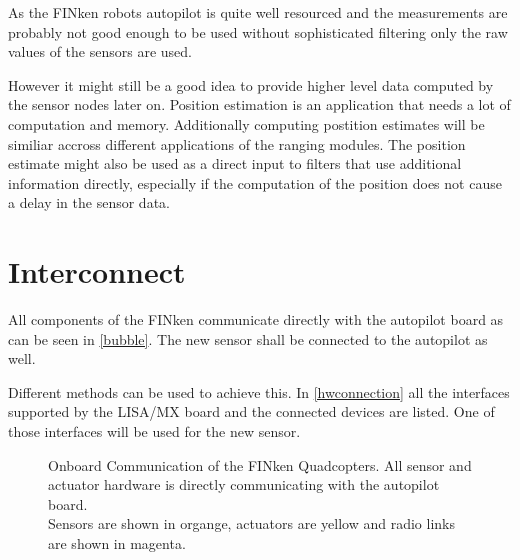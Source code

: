 As the FINken robots autopilot is quite well resourced and the measurements are probably not good enough to be used without sophisticated filtering only the raw values of the sensors are used.

However it might still be a good idea to provide higher level data computed by the sensor nodes later on.
Position estimation is an application that needs a lot of computation and memory.
Additionally computing postition estimates will be similiar accross different applications of the ranging modules.
The position estimate might also be used as a direct input to filters that use additional information directly, especially if the computation of the position does not cause a delay in the sensor data.


\section{Interconnect}
All components of the FINken communicate directly with the autopilot board as can be seen in \autoref{bubble}.
The new sensor shall be connected to the autopilot as well.

Different methods can be used to achieve this.
In \autoref{hwconnection} all the interfaces supported by the LISA/MX board and the connected devices are listed.
One of those interfaces will be used for the new sensor.

\begin{figure}[h]
	\centering	
	\label{bubble}
	\caption[Onboard Communication of the FINken Quadcopters]
	{Onboard Communication of the FINken Quadcopters. All sensor and actuator hardware is directly communicating with the autopilot board.
		\\
		Sensors are shown in organge, actuators are yellow and radio links are shown in magenta.
	}
\end{figure}

